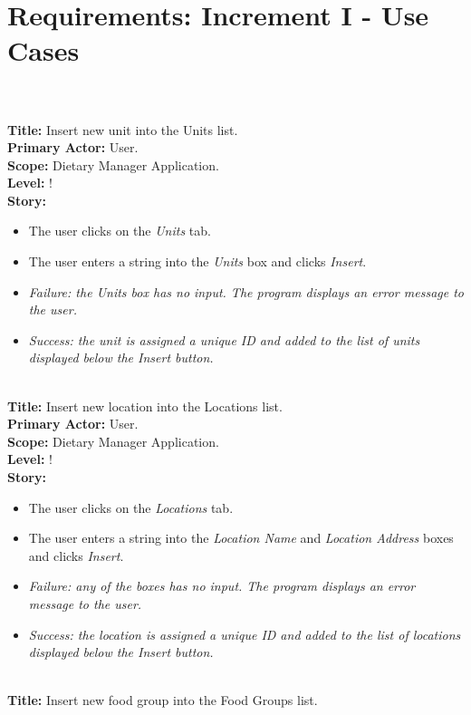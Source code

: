 \documentclass{article}
\begin{document}
\section{Requirements: Increment I - Use Cases}
\\\\
\textbf{Title:} Insert new unit into the Units list.
\\
\textbf{Primary Actor:} User.
\\
\textbf{Scope:} Dietary Manager Application.
\\
\textbf{Level:} !
\\
\textbf{Story:}
\begin{itemize}
    \item The user clicks on the \textit{Units} tab.
    \item The user enters a string into the \textit{Units} box and clicks \textit{Insert}.
    \item \em Failure: \em the \textit{Units} box has no input. The program displays an error message to the user.
    \item \em Success: \em the unit is assigned a unique ID and added to the list of units displayed below the \textit{Insert} button.\\
\end{itemize}
\\
\textbf{Title:} Insert new location into the Locations list.
\\
\textbf{Primary Actor:} User.
\\
\textbf{Scope:} Dietary Manager Application.
\\
\textbf{Level:} !
\\
\textbf{Story:}
\begin{itemize}
    \item The user clicks on the \textit{Locations} tab.
    \item The user enters a string into the \textit{Location Name} and \textit{Location Address} boxes and clicks \textit{Insert}.
    \item \em Failure: \em any of the boxes has no input. The program displays an error message to the user.
    \item \em Success: \em the location is assigned a unique ID and added to the list of locations displayed below the \textit{Insert} button.\\
\end{itemize}
\\
\textbf{Title:} Insert new food group into the Food Groups list.
\\
\end{document}
